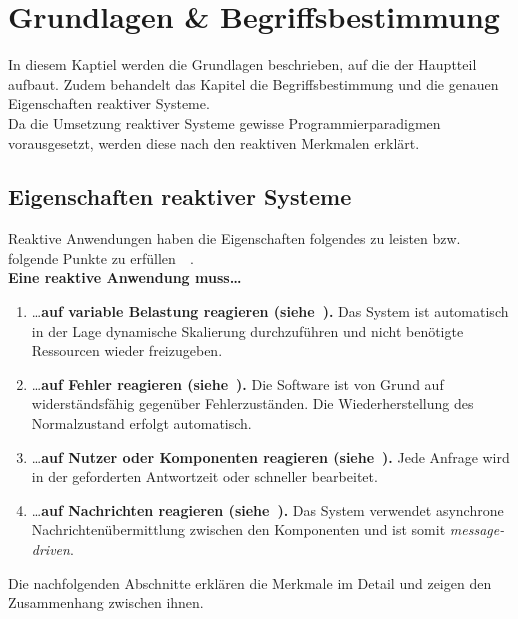 \chapter{Grundlagen \& Begriffsbestimmung}
In diesem Kaptiel werden die Grundlagen beschrieben, auf die der Hauptteil aufbaut. Zudem behandelt das Kapitel die Begriffsbestimmung und die genauen Eigenschaften reaktiver Systeme.\\
Da die Umsetzung reaktiver Systeme gewisse Programmierparadigmen vorausgesetzt, werden diese nach den reaktiven Merkmalen erklärt.

\section{Eigenschaften reaktiver Systeme}
Reaktive Anwendungen haben die Eigenschaften folgendes zu leisten bzw. folgende Punkte zu erfüllen~\cite[S.~19ff]{kuhn_reactive_2015}~\cite[S.~6]{vernon_reactive_2016}.\\

\textbf{Eine reaktive Anwendung muss\ldots}
\begin{enumerate}
\item \ldots \textbf{auf variable Belastung reagieren (siehe~).} Das System ist automatisch in der Lage dynamische Skalierung durchzuführen und nicht benötigte Ressourcen wieder freizugeben.
\item \ldots \textbf{auf Fehler reagieren (siehe~).} Die Software ist von Grund auf widerständsfähig gegenüber Fehlerzuständen. Die Wiederherstellung des Normalzustand erfolgt automatisch.
\item \ldots \textbf{auf Nutzer oder Komponenten reagieren (siehe~).} Jede Anfrage wird in der geforderten Antwortzeit oder schneller bearbeitet.
\item \ldots \textbf{auf Nachrichten reagieren (siehe~).} Das System verwendet asynchrone Nachrichtenübermittlung zwischen den Komponenten und ist somit \textit{message-driven}.
\end{enumerate}

Die nachfolgenden Abschnitte erklären die Merkmale im Detail und zeigen den Zusammenhang zwischen ihnen.

